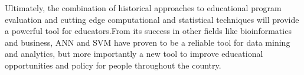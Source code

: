 \documentclass[12pt,a4paper]{article}
\begin{document}
Ultimately, the combination of historical approaches to educational program evaluation and cutting edge computational and statistical techniques will provide a powerful tool for educators.From its success in other fields like bioinformatics and business, ANN and SVM have proven to be a reliable tool for data mining and analytics, but more importantly a new tool to improve educational opportunities and policy for people throughout the country.
\newpage


\end{document}
